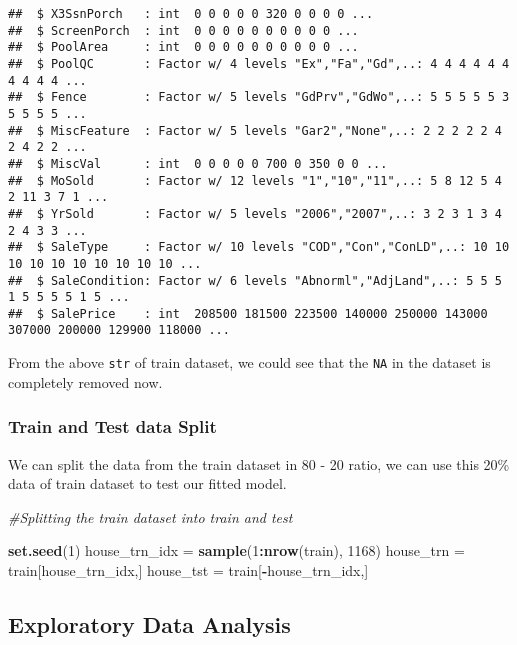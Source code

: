 \documentclass[]{article}
\newenvironment{Shaded}{\begin{snugshade}}{\end{snugshade}}
\newcommand{\KeywordTok}[1]{\textcolor[rgb]{0.13,0.29,0.53}{\textbf{#1}}}
\newcommand{\DecValTok}[1]{\textcolor[rgb]{0.00,0.00,0.81}{#1}}
\newcommand{\StringTok}[1]{\textcolor[rgb]{0.31,0.60,0.02}{#1}}
\newcommand{\CommentTok}[1]{\textcolor[rgb]{0.56,0.35,0.01}{\textit{#1}}}
\newcommand{\OperatorTok}[1]{\textcolor[rgb]{0.81,0.36,0.00}{\textbf{#1}}}
\newcommand{\NormalTok}[1]{#1}
\begin{document}
\begin{verbatim}
##  $ X3SsnPorch   : int  0 0 0 0 0 320 0 0 0 0 ...
##  $ ScreenPorch  : int  0 0 0 0 0 0 0 0 0 0 ...
##  $ PoolArea     : int  0 0 0 0 0 0 0 0 0 0 ...
##  $ PoolQC       : Factor w/ 4 levels "Ex","Fa","Gd",..: 4 4 4 4 4 4 4 4 4 4 ...
##  $ Fence        : Factor w/ 5 levels "GdPrv","GdWo",..: 5 5 5 5 5 3 5 5 5 5 ...
##  $ MiscFeature  : Factor w/ 5 levels "Gar2","None",..: 2 2 2 2 2 4 2 4 2 2 ...
##  $ MiscVal      : int  0 0 0 0 0 700 0 350 0 0 ...
##  $ MoSold       : Factor w/ 12 levels "1","10","11",..: 5 8 12 5 4 2 11 3 7 1 ...
##  $ YrSold       : Factor w/ 5 levels "2006","2007",..: 3 2 3 1 3 4 2 4 3 3 ...
##  $ SaleType     : Factor w/ 10 levels "COD","Con","ConLD",..: 10 10 10 10 10 10 10 10 10 10 ...
##  $ SaleCondition: Factor w/ 6 levels "Abnorml","AdjLand",..: 5 5 5 1 5 5 5 5 1 5 ...
##  $ SalePrice    : int  208500 181500 223500 140000 250000 143000 307000 200000 129900 118000 ...
\end{verbatim}

From the above \texttt{str} of train dataset, we could see that the
\texttt{NA} in the dataset is completely removed now.

\subsubsection{Train and Test data
Split}\label{train-and-test-data-split}

We can split the data from the train dataset in 80 - 20 ratio, we can
use this 20\% data of train dataset to test our fitted model.

\begin{Shaded}
\begin{Highlighting}[]
\CommentTok{#Splitting the train dataset into train and test}

\KeywordTok{set.seed}\NormalTok{(}\DecValTok{1}\NormalTok{)}
\NormalTok{house_trn_idx =}\StringTok{ }\KeywordTok{sample}\NormalTok{(}\DecValTok{1}\OperatorTok{:}\KeywordTok{nrow}\NormalTok{(train), }\DecValTok{1168}\NormalTok{)}
\NormalTok{house_trn =}\StringTok{ }\NormalTok{train[house_trn_idx,]}
\NormalTok{house_tst =}\StringTok{ }\NormalTok{train[}\OperatorTok{-}\NormalTok{house_trn_idx,]}
\end{Highlighting}
\end{Shaded}

\subsection{Exploratory Data Analysis}\label{exploratory-data-analysis}
\end{document}

